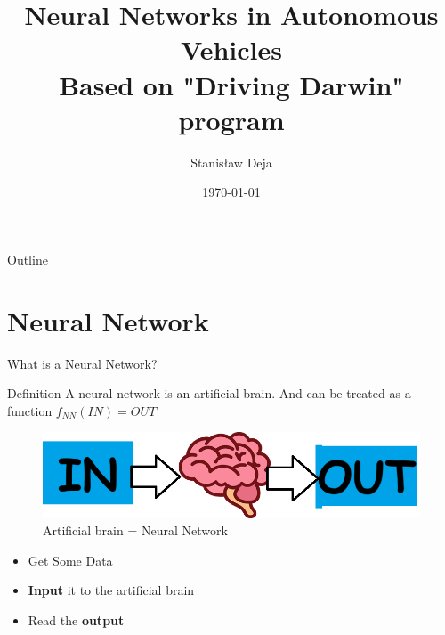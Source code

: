 \documentclass{do}
\title{%
  Neural Networks in Autonomous Vehicles \\
  \small Based on "Driving Darwin" program}
\author{Stanisław Deja}
\date{\today}
\begin{document}
\begin{frame}
  \titlepage
\end{frame}

\begin{frame}{Outline}
  \tableofcontents
\end{frame}

\section{Neural Network}
\begin{frame}{What is a Neural Network?}
    \begin{block}{Definition}
    A neural network is an artificial brain. And can be treated as a function 
    \begin{math}
    f_{NN}(IN)=OUT
    \end{math}
  \end{block}

  \begin{figure}
    \includegraphics[width=0.6\linewidth]{brain.png}
    \caption{Artificial brain = Neural Network}
  \end{figure}
  \begin{itemize}
      \item Get Some Data
      \item \textbf{Input} it to the artificial brain
      \item Read the \textbf{output}
  \end{itemize}
\end{frame}
\end{document}
